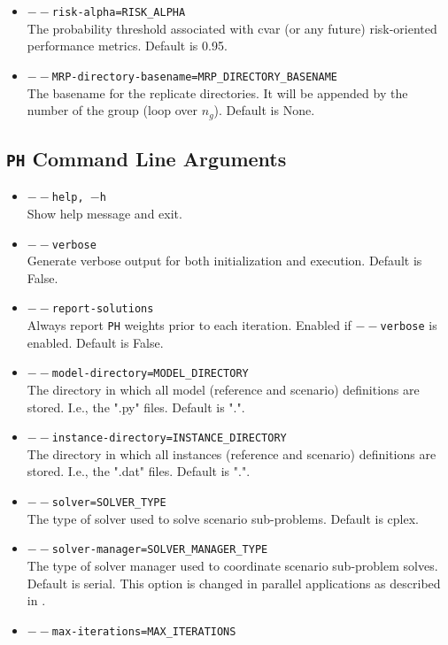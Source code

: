 \documentclass[a4paper]{article}
\begin{document}
\begin{itemize}
	\item \texttt{$--$risk-alpha=RISK\_ALPHA}\\
	The probability threshold associated with cvar (or any future) risk-oriented performance metrics. Default is 0.95.
	\item \texttt{$--$MRP-directory-basename=MRP\_DIRECTORY\_BASENAME}\\
	The basename for the replicate directories. It will be appended by the number of the group (loop over $n_g$). Default is None.
\end{itemize}


\subsection{\texttt{PH} Command Line Arguments}

\begin{itemize}
	\item \texttt{$--$help, $-$h}\\
	Show help message and exit.
	\item \texttt{$--$verbose}\\
	Generate verbose output for both initialization and execution. Default is False. 
	\item \texttt{$--$report-solutions}\\
	Always report \texttt{PH} weights prior to each iteration. Enabled if \texttt{$--$verbose} is enabled. Default is False. 
	\item \texttt{$--$model-directory=MODEL\_DIRECTORY}\\
	The directory in which all model (reference and scenario) definitions are stored. I.e., the ".py" files. Default is ".".
	\item \texttt{$--$instance-directory=INSTANCE\_DIRECTORY}\\
	The directory in which all instances (reference and scenario) definitions are stored. I.e., the ".dat" files. Default is ".".
	\item \texttt{$--$solver=SOLVER\_TYPE}\\
	The type of solver used to solve scenario sub-problems. Default is cplex.
	\item \texttt{$--$solver-manager=SOLVER\_MANAGER\_TYPE}\\
	The type of solver manager used to coordinate scenario sub-problem solves. Default is serial. This option is changed in parallel applications as described in \cite{pysp}.
	\item \texttt{$--$max-iterations=MAX\_ITERATIONS}\\

\end{itemize}
\end{document}
